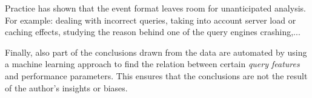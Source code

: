 Practice has shown that the event format leaves room for unanticipated analysis. For example: dealing with incorrect queries, taking into account server load or caching effects, studying the reason behind one of the query engines crashing,...

Finally, also part of the conclusions drawn from the data are automated by using a machine learning approach to find the relation between certain \emph{query features} and performance parameters. This ensures that the conclusions are not the result of the author's insights or biases. 


